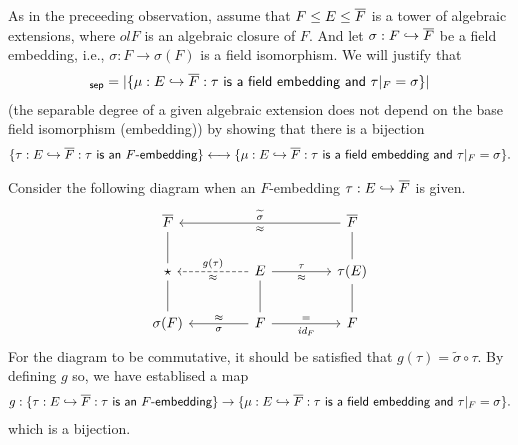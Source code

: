 \begin{obs}
    As in the preceeding observation, assume that $F\leq E\leq \overline{F}$ is a tower of algebraic extensions, where $ol F$ is an algebraic closure of $F$.
    And let $\sigma: F\hookrightarrow\overline{F}$ be a field embedding, i.e., $\sigma: F\rightarrow \sigma(F)$ is a field isomorphism.
    We will justify that
    \begin{align*}
        [E:F]_\sep=|\{\mu: E\hookrightarrow\ol F: \textsf{$\tau$ is a field embedding and $\tau|_F=\sigma$}\}|
    \end{align*}
    (the separable degree of a given algebraic extension does not depend on the base field isomorphism (embedding)) by showing that there is a bijection
    \begin{align*}
        \{\tau: E\hookrightarrow\overline{F}: \textsf{$\tau$ is an $F$-embedding}\}
        \longleftrightarrow
        \{\mu: E\hookrightarrow\overline{F}: \textsf{$\tau$ is a field embedding and $\tau|_F=\sigma$}\}.
    \end{align*}

    Consider the following diagram when an $F$-embedding $\tau: E\hookrightarrow\overline{F}$ is given.
    \begin{equation*}
    \begin{tikzcd}[row sep=0.7cm, column sep=1.5cm]
        \ol F
        &
        &
        \ol F
            \arrow[ll, "\widetilde{\sigma}"', "\approx"]
        \\
        \star
            \arrow[u, dash]
        &
        E
            \arrow[l, "g(\tau)"', "\approx", dashed]
            \arrow[r, "\tau", "\approx"']
        &
        \tau(E)
            \arrow[u, dash]
        \\
        \sigma(F)
            \arrow[u, dash]
        &
        F
            \arrow[l, "\sigma", "\approx"']
            \arrow[u, dash]
            \arrow[r, "\id{F}"', "="]
        &
        F
            \arrow[u, dash]
    \end{tikzcd}
    \end{equation*}
    For the diagram to be commutative, it should be satisfied that $g(\tau)=\widetilde{\sigma}\circ\tau$.
    By defining $g$ so, we have establised a map
    \begin{align*}
        g:
        \{\tau: E\hookrightarrow\overline{F}: \textsf{$\tau$ is an $F$-embedding}\}
        \rightarrow
        \{\mu: E\hookrightarrow\overline{F}: \textsf{$\tau$ is a field embedding and $\tau|_F=\sigma$}\}.
    \end{align*}
    \color{brown}which is a bijection\color{black}.
\end{obs}

